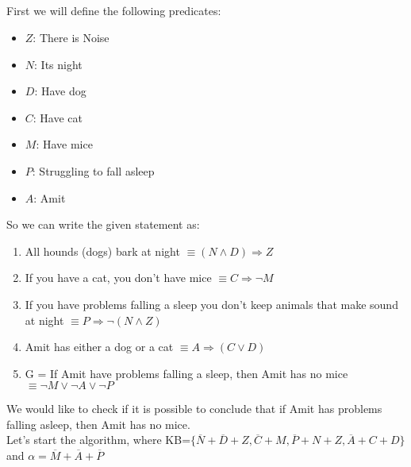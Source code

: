 \documentclass{article}
\begin{document}
\subsection{}
First we will define the following predicates:
\begin{itemize}
    \item $Z$: There is Noise
    \item $N$: Its night 
    \item $D$: Have dog 
    \item $C$: Have cat
    \item $M$: Have mice
    \item $P$: Struggling to fall asleep
    \item $A$: Amit 
\end{itemize}
So we can write the given statement as:
\begin{enumerate}
    \item All hounds (dogs) bark at night $\equiv (N \land D) \Rightarrow Z$
    \item If you have a cat, you don’t have mice $\equiv C \Rightarrow \neg M$
    \item If you have problems falling a sleep you don’t keep animals that make sound at night $\equiv P \Rightarrow \neg (N\land Z)$
    \item Amit has either a dog or a cat $\equiv A \Rightarrow (C\lor D)$
    \item G = If Amit have problems falling a sleep, then Amit has no mice $ \equiv \neg M \lor \neg A \lor \neg P $
\end{enumerate}
We would like to check if it is possible to conclude that if Amit has problems falling asleep, then Amit has no mice.\\
Let's start the algorithm, where KB=$\{\overline N + \overline D + Z,\overline C + M,\overline P + N+Z, \overline A + C+D\}$ and $\alpha = \overline M + \overline A + \overline P$\\
\end{document}
